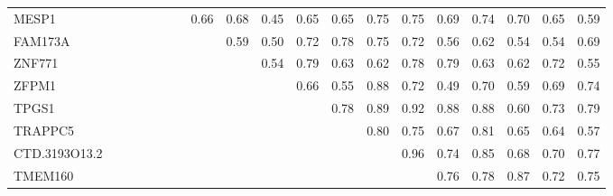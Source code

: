 \begin{longtable}{lrrrrrrrrrrrrrrrrrr}
MESP1         &           &               &            &            &               &             &          0.66 &         0.68 &        0.45 &        0.65 &          0.65 &                0.75 &          0.75 &       0.69 &         0.74 &           0.70 &            0.65 &          0.59 \\
FAM173A       &           &               &            &            &               &             &               &         0.59 &        0.50 &        0.72 &          0.78 &                0.75 &          0.72 &       0.56 &         0.62 &           0.54 &            0.54 &          0.69 \\
ZNF771        &           &               &            &            &               &             &               &              &        0.54 &        0.79 &          0.63 &                0.62 &          0.78 &       0.79 &         0.63 &           0.62 &            0.72 &          0.55 \\
ZFPM1         &           &               &            &            &               &             &               &              &             &        0.66 &          0.55 &                0.88 &          0.72 &       0.49 &         0.70 &           0.59 &            0.69 &          0.74 \\
TPGS1         &           &               &            &            &               &             &               &              &             &             &          0.78 &                0.89 &          0.92 &       0.88 &         0.88 &           0.60 &            0.73 &          0.79 \\
TRAPPC5       &           &               &            &            &               &             &               &              &             &             &               &                0.80 &          0.75 &       0.67 &         0.81 &           0.65 &            0.64 &          0.57 \\
CTD.3193O13.2 &           &               &            &            &               &             &               &              &             &             &               &                     &          0.96 &       0.74 &         0.85 &           0.68 &            0.70 &          0.77 \\
TMEM160       &           &               &            &            &               &             &               &              &             &             &               &                     &               &       0.76 &         0.78 &           0.87 &            0.72 &          0.75 \\

\end{longtable}
